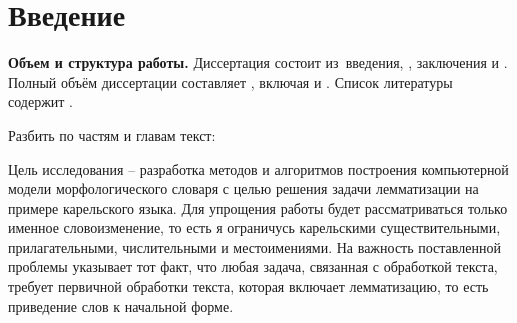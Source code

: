 \chapter*{Введение}                         %

\newcommand{\actuality}{}
\newcommand{\progress}{}
\newcommand{\aim}{{\textbf\aimTXT}}
\newcommand{\tasks}{\textbf{\tasksTXT}}
\newcommand{\novelty}{\textbf{\noveltyTXT}}
\newcommand{\influence}{\textbf{\influenceTXT}}
\newcommand{\methods}{\textbf{\methodsTXT}}
\newcommand{\defpositions}{\textbf{\defpositionsTXT}}
\newcommand{\reliability}{\textbf{\reliabilityTXT}}
\newcommand{\probation}{\textbf{\probationTXT}}
\newcommand{\contribution}{\textbf{\contributionTXT}}
\newcommand{\publications}{\textbf{\publicationsTXT}}


\textbf{Объем и структура работы.} Диссертация состоит из~введения,
,
заключения и
.
%
Полный объём диссертации составляет
, включая
 и
.
Список литературы содержит
.

Разбить по частям и главам текст:

Цель исследования -- разработка методов и алгоритмов построения компьютерной модели морфологического словаря с целью решения задачи лемматизации на примере карельского языка. Для упрощения работы будет рассматриваться только именное словоизменение, то есть я ограничусь карельскими существительными, прилагательными, числительными и местоимениями.
На важность поставленной проблемы указывает тот факт, что любая задача, связанная с обработкой текста, требует первичной обработки текста, которая включает лемматизацию, то есть приведение слов к начальной форме.

